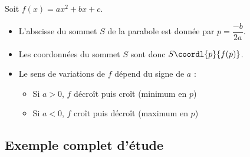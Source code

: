 \begin{prop}
	Soit $f(x) = ax^2 + bx + c$.
	\begin{itemize}
		\item L'abscisse du sommet $S$ de la parabole est donnée par $p = \dfrac{-b}{2a}$.
		\item Les coordonnées du sommet $S$ sont donc $S\coordl{p}{f(p)}$.
		\item Le sens de variations de $f$ dépend du signe de $a$ :
		      \begin{itemize}
			      \item Si $a > 0$, $f$ décroît puis croît (minimum en $p$)
			      \item Si $a < 0$, $f$ croît puis décroît (maximum en $p$)
		      \end{itemize}
	\end{itemize}
\end{prop}

\subsection{Exemple complet d'étude}

